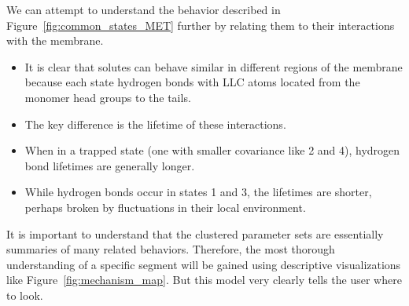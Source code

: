 \documentclass{article}
\begin{document}
  We can attempt to understand the behavior described in Figure~\ref{fig:common_states_MET}
  further by relating them to their interactions with the membrane. 
  \begin{itemize}
    \item It is clear that solutes can behave similar in different regions of the 
    membrane because each state hydrogen bonds with LLC atoms located from the monomer head
    groups to the tails. 
    \item The key difference is the lifetime of these interactions. 
    \item When in a trapped state (one with smaller covariance like 2 and 4), hydrogen bond
    lifetimes are generally longer.
    \item While hydrogen bonds occur in states 1 and 3, the lifetimes are shorter, perhaps
    broken by fluctuations in their local environment.
  \end{itemize}
  
  It is important to understand that the clustered parameter sets are
  essentially summaries of many related behaviors. Therefore, the most thorough
  understanding of a specific segment will be gained using descriptive visualizations
  like Figure~\ref{fig:mechanism_map}. But this model very clearly tells the user where
  to look.
  
\end{document}
